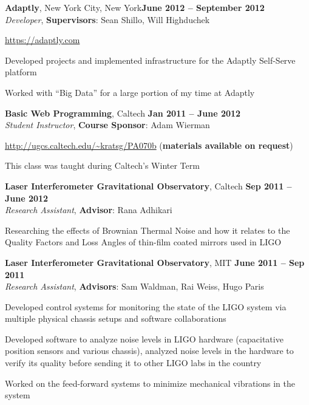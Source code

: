 \documentclass[margin,line]{resume}
\begin{document}
\begin{resume}
\textbf{Adaptly}, New York City, New York\hfill \textbf{June 2012 -- September 2012}\\
\textsl{Developer}, \textbf{Supervisors}: Sean Shillo, Will Highduchek
\begin{list2}
  \item \url{https://adaptly.com}
  \item Developed projects and implemented infrastructure for the Adaptly Self-Serve platform
  \item Worked with ``Big Data'' for a large portion of my time at Adaptly
\end{list2}

\textbf{Basic Web Programming}, Caltech \hfill \textbf{Jan 2011 -- June 2012}\\
\textsl{Student Instructor}, \textbf{Course Sponsor}: Adam Wierman
\begin{list2}
  \item \url{http://ugcs.caltech.edu/~kratsg/PA070b} (\textbf{materials available on request})
  \item This class was taught during Caltech's Winter Term
\end{list2}

\textbf{Laser Interferometer Gravitational Observatory}, Caltech \hfill \textbf{Sep 2011 -- June 2012}\\
\textsl{Research Assistant}, \textbf{Advisor}: Rana Adhikari
\begin{list2}
  \item Researching the effects of Brownian Thermal Noise and how it relates to the Quality Factors and Loss Angles of thin-film coated mirrors used in LIGO
\end{list2}

\textbf{Laser Interferometer Gravitational Observatory}, MIT \hfill \textbf{June 2011 -- Sep 2011}\\
\textsl{Research Assistant}, \textbf{Advisors}: Sam Waldman, Rai Weiss, Hugo Paris
\begin{list2}
  \item Developed control systems for monitoring the state of the LIGO system via multiple physical chassis setups and software collaborations
  \item Developed software to analyze noise levels in LIGO hardware (capacitative position sensors and various chassis), analyzed noise levels in the hardware to verify its quality before sending it to other LIGO labs in the country
  \item Worked on the feed-forward systems to minimize mechanical vibrations in the system
\end{list2}


\end{resume}
\end{document}
